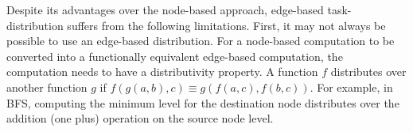 \REM {
\begin{algorithm}
\begin{small}
\SetKwProg{Fn}{}{ \{}{\}}

\Fn(){\textbf{sssp\_kernel}($graph, dist, inputWl, outputWl$)}{


\For{each edge $e$ assigned to me}{
  $altdist = dist[e.source] + e.weight$ \\
 
  \If{$dist[e.destination] > altdist$}{
    $dist[e.destination]$ = $altdist$ \\
    $outputWl.push(e.destination.edges)$ \label{work-chunk-line} \\
  }
}
}
\caption{Example GPU Pseudocode for Edge-Based Parallelism (SSSP)}
\label{EP-gpu-pseudocode}
\end{small}
\end{algorithm}
}

Despite its advantages over the node-based approach, edge-based task-distribution suffers from the following limitations.
First, it may not always be possible to use an edge-based distribution.
For a node-based computation to be converted into a functionally equivalent edge-based computation, the computation needs to have a distributivity property.
A function $f$ distributes over another function $g$ if $f(g(a, b), c) \equiv g(f(a, c), f(b, c))$.
For example, in BFS, computing the minimum level for the destination node distributes over the addition (one plus) operation on the source node level.

